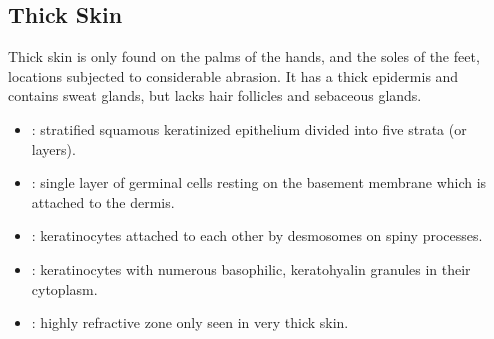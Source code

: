 \subsection{Thick Skin}
Thick skin is only found on the palms of the hands, and the soles of the feet, locations subjected to considerable abrasion. It has a thick epidermis and contains sweat glands, but lacks hair follicles and sebaceous glands.
\begin{center}
\end{center}
\begin{multicols}{2}
\begin{itemize}
  \item {}: stratified squamous keratinized epithelium divided into five strata (or layers). 
  
  \begin{center}
  \end{center}
  
  \item {}: single layer of germinal cells resting on the basement membrane which is attached to the dermis.
  
  \begin{center}
  \end{center}
  
  \item {}: keratinocytes attached to each other by desmosomes on spiny processes.
  
  \begin{center}
  \end{center}
  
  \item {}: keratinocytes with numerous basophilic, keratohyalin granules in their cytoplasm.
  
  \begin{center}
  \end{center}
  
  \item {}: highly refractive zone only seen in very thick skin.
  
  \begin{center}
  \end{center}
  

\end{itemize}
\end{multicols}

